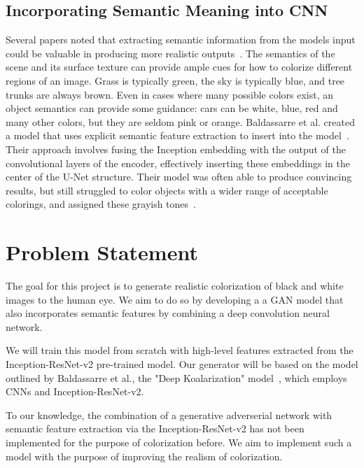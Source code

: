 \documentclass[10pt,twocolumn,letterpaper]{article}
\begin{document}
\subsection{Incorporating Semantic Meaning into CNN}
Several papers noted that extracting semantic information from the models input could be valuable in producing more realistic outputs~\cite{Zhang, Pix2Pix}. The semantics of the scene and its surface texture can provide ample cues for how to colorize different regions of an image. Grass is typically green, the sky is typically blue, and tree trunks are always brown. Even in cases where many possible colors exist, an object semantics can provide some guidance: cars can be white, blue, red and many other colors, but they are seldom pink or orange.  Baldassarre et al. created a model that uses explicit semantic feature extraction to insert into the model~\cite{Koalarization}. Their approach involves fusing the Inception embedding with the output of the convolutional layers of the encoder, effectively inserting these embeddings in the center of the U-Net structure. Their model was often able to produce convincing results, but still struggled to color objects with a wider range of acceptable colorings, and assigned these grayish tones~\cite{Koalarization}.

\section{Problem Statement}
The goal for this project is to generate realistic colorization of black and white images to the human eye. We aim to do so by developing a a GAN model that also incorporates semantic features by combining a deep convolution neural network. 

We will train this model from scratch with high-level features extracted from the Inception-ResNet-v2 pre-trained model. Our generator will be based on the model outlined by Baldassarre et al., the "Deep Koalarization" model~\cite{Koalarization}, which employs CNNs and Inception-ResNet-v2. 

To our knowledge, the combination of a generative adverserial network with semantic feature extraction via the Inception-ResNet-v2 has not been implemented for the purpose of colorization before. We aim to implement such a model with the purpose of improving the realism of colorization. 

\end{document}
